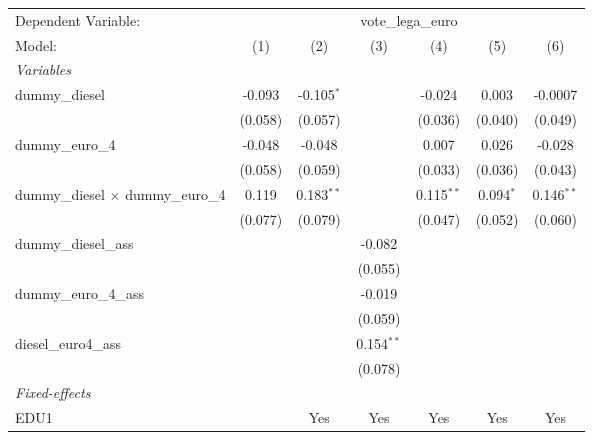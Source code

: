 
\begingroup
\centering
\begin{tabular}{lcccccc}
   \tabularnewline \midrule \midrule
   Dependent Variable: & \multicolumn{6}{c}{vote\_lega\_euro}\\
   Model:                                    & (1)     & (2)          & (3)          & (4)          & (5)         & (6)\\  
   \midrule
   \emph{Variables}\\
   dummy\_diesel                             & -0.093  & -0.105$^{*}$ &              & -0.024       & 0.003       & -0.0007\\   
                                             & (0.058) & (0.057)      &              & (0.036)      & (0.040)     & (0.049)\\   
   dummy\_euro\_4                            & -0.048  & -0.048       &              & 0.007        & 0.026       & -0.028\\   
                                             & (0.058) & (0.059)      &              & (0.033)      & (0.036)     & (0.043)\\   
   dummy\_diesel $\times$ dummy\_euro\_4     & 0.119   & 0.183$^{**}$ &              & 0.115$^{**}$ & 0.094$^{*}$ & 0.146$^{**}$\\   
                                             & (0.077) & (0.079)      &              & (0.047)      & (0.052)     & (0.060)\\   
   dummy\_diesel\_ass                        &         &              & -0.082       &              &             &   \\   
                                             &         &              & (0.055)      &              &             &   \\   
   dummy\_euro\_4\_ass                       &         &              & -0.019       &              &             &   \\   
                                             &         &              & (0.059)      &              &             &   \\   
   diesel\_euro4\_ass                        &         &              & 0.154$^{**}$ &              &             &   \\   
                                             &         &              & (0.078)      &              &             &   \\   
   \midrule
   \emph{Fixed-effects}\\
   EDU1                                      &         & Yes          & Yes          & Yes          & Yes         & Yes\\  

\end{tabular}
